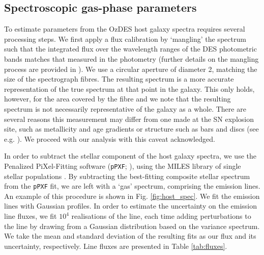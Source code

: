 \documentclass[fleqn,usenatbib,]{mnras}
\begin{document}
\subsection{Spectroscopic gas-phase parameters \label{subsec:linefit}}

To estimate parameters from the OzDES host galaxy spectra requires several processing steps. We first apply a flux calibration by `mangling' the spectrum such that the integrated flux over the wavelength ranges of the DES photometric bands matches that measured in the photometry (further details on the mangling process are provided in \citealt{Swann2020}). We use a circular aperture of diameter 2\arcsec, matching the size of the spectrograph fibres. The resulting spectrum is a more accurate representation of the true spectrum at that point in the galaxy. This only holds, however, for the area covered by the fibre and we note that the resulting spectrum is not necessarily representative of the galaxy as a whole. There are several reasons this measurement may differ from one made at the SN explosion site, such as metallicity and age gradients or structure such as bars and discs (see e.g. \citealt{Iglesias-Paramo2013,Iglesias-Paramo2016}). We proceed with our analysis with this caveat acknowledged.

In order to subtract the stellar component of the host galaxy spectra, we use the Penalized PiXel-Fitting software (\texttt{pPXF}; \citealt{Cappellari2004,Cappellari2012,Cappellari2017}), using the MILES library of single stellar populations \citep{Vazdekis2010}. By subtracting the best-fitting composite stellar spectrum from the \texttt{pPXF} fit, we are left with a `gas' spectrum, comprising the emission lines. An example of this procedure is shown in Fig. \ref{fig:host_spec}. We fit the emission lines with Gaussian profiles. In order to estimate the uncertainty on the emission line fluxes, we fit $10^4$ realisations of the line, each time adding perturbations to the line by drawing from a Gaussian distribution based on the variance spectrum. We take the mean and standard deviation of the resulting fits as our flux and its uncertainty, respectively. Line fluxes are presented in Table \ref{tab:fluxes}.
\end{document}
